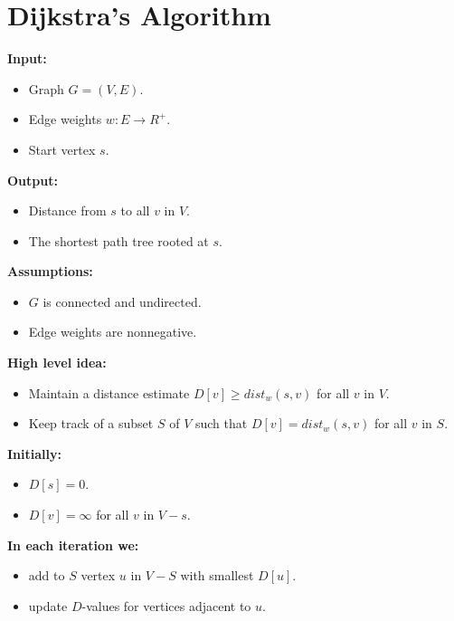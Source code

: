 \documentclass[12pt]{article}
\newcommand{\1}{\space \quad}
\newcommand{\2}{\quad \quad \quad}
\newcommand{\3}{\quad \quad \quad \quad \space}
\newcommand{\4}{\quad \quad \quad \quad \quad \quad}
\newcommand{\5}{\quad \quad \quad \quad \quad \quad \quad \space}
\begin{document}
\section{Dijkstra’s Algorithm}
\begin{minipage}[t]{0.5\textwidth}
  \textbf{Input:}
  \begin{itemize}
  \item Graph $G = (V, E)$.
  \item Edge weights $w : E \rightarrow R^+$.
  \item Start vertex $s$.
  \end{itemize}
  \textbf{Output:}
  \begin{itemize}
  \item Distance from $s$ to all $v$ in $V$.
  \item The shortest path tree rooted at $s$.
  \end{itemize}
  \textbf{Assumptions:}
  \begin{itemize}
  \item $G$ is connected and undirected.
  \item Edge weights are nonnegative.
  \end{itemize}
\end{minipage}
\begin{minipage}[t]{0.49\textwidth}
  \textbf{High level idea:}
  \begin{itemize}
  \item Maintain a distance estimate $D[v] \geq dist_w(s, v)$ for all $v$ in $V$.
  \item Keep track of a subset $S$ of $V$ such that $D[v] = dist_w(s, v)$ for all $v$ in $S$.
  \end{itemize}
  \textbf{Initially:}
  \begin{itemize}
  \item $D[s] = 0$.
  \item $D[v] = \infty$ for all $v$ in $V - s$.
  \end{itemize}
  \textbf{In each iteration we:}
  \begin{itemize}
  \item add to $S$ vertex $u$ in $V - S$ with smallest $D[u]$.
  \item update $D$-values for vertices adjacent to $u$.
  \end{itemize}
\end{minipage}
\end{document}
